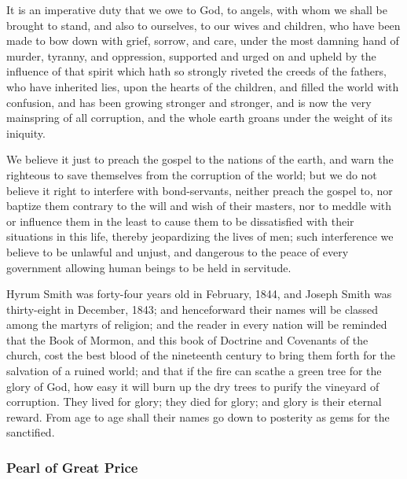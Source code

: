 			\begin{compactdesc}
				\item[DC 123:7] It is an imperative duty that we owe to God, to angels, with whom we shall be brought to stand, and also to ourselves, to our wives and children, who have been made to bow down with grief, sorrow, and care, under the most damning hand of murder, tyranny, and oppression, supported and urged on and upheld by the influence of that spirit which hath so strongly riveted the creeds of the fathers, who have inherited lies, upon the hearts of the children, and filled the world with confusion, and has been growing stronger and stronger, and is now the very mainspring of all corruption, and the whole earth groans under the weight of its iniquity.
				\item[DC 134:12] We believe it just to preach the gospel to the nations of the earth, and warn the righteous to save themselves from the corruption of the world; but we do not believe it right to interfere with bond-servants, neither preach the gospel to, nor baptize them contrary to the will and wish of their masters, nor to meddle with or influence them in the least to cause them to be dissatisfied with their situations in this life, thereby jeopardizing the lives of men; such interference we believe to be unlawful and unjust, and dangerous to the peace of every government allowing human beings to be held in servitude.
				\item[DC 135:6] Hyrum Smith was forty-four years old in February, 1844, and Joseph Smith was thirty-eight in December, 1843; and henceforward their names will be classed among the martyrs of religion; and the reader in every nation will be reminded that the Book of Mormon, and this book of Doctrine and Covenants of the church, cost the best blood of the nineteenth century to bring them forth for the salvation of a ruined world; and that if the fire can scathe a green tree for the glory of God, how easy it will burn up the dry trees to purify the vineyard of corruption. They lived for glory; they died for glory; and glory is their eternal reward. From age to age shall their names go down to posterity as gems for the sanctified.
			\end{compactdesc}
		
	\subsubsection{Pearl of Great Price} %
		\label{CORRUPTION-PGP}
		
